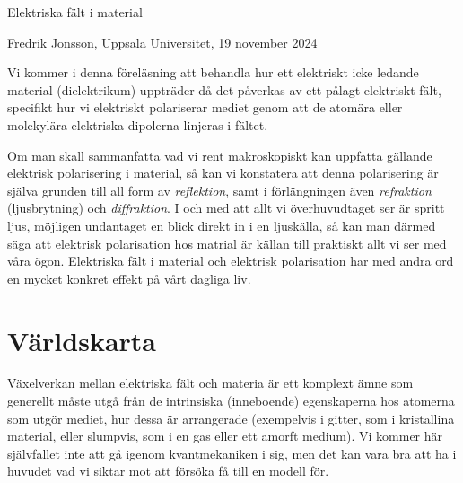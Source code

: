 \centerline{\twelvesc Elektriska f\"alt i material}
\centerline{Fredrik Jonsson, Uppsala Universitet, 19 november 2024}
\vskip24pt
\noindent
Vi kommer i denna f{\"o}rel{\"a}sning att behandla hur ett elektriskt icke
ledande material (dielektrikum) upptr{\"a}der d{\aa} det p{\aa}verkas av ett
p{\aa}lagt elektriskt f{\"a}lt, specifikt hur vi elektriskt polariserar mediet
genom att de atom{\"a}ra eller molekyl{\"a}ra elektriska dipolerna linjeras i
f{\"a}ltet.

Om man skall sammanfatta vad vi rent makroskopiskt kan uppfatta g{\"a}llande
elektrisk polarisering i material, s{\aa} kan vi konstatera att denna
polarisering {\"a}r sj{\"a}lva grunden till all form av {\it reflektion},
samt i f{\"o}rl{\"a}ngningen {\"a}ven {\it refraktion} (ljusbrytning) och
{\it diffraktion}.
I och med att allt vi {\"o}verhuvudtaget ser {\"a}r spritt ljus, m{\"o}jligen
undantaget en blick direkt in i en ljusk{\"a}lla, s{\aa} kan man d{\"a}rmed
s{\"a}ga att elektrisk polarisation hos matrial {\"a}r k{\"a}llan till praktiskt
allt vi ser med v{\aa}ra {\"o}gon. Elektriska f{\"a}lt i material och elektrisk
polarisation har med andra ord en mycket konkret effekt p{\aa} v{\aa}rt dagliga
liv.

\section{V{\"a}rldskarta}
V{\"a}xelverkan mellan elektriska f{\"a}lt och materia {\"a}r ett komplext
{\"a}mne som generellt m{\aa}ste utg{\aa} fr{\aa}n de intrinsiska (inneboende)
egenskaperna hos atomerna som utg{\"o}r mediet, hur dessa {\"a}r arrangerade
(exempelvis i gitter, som i kristallina material, eller slumpvis, som i en gas
eller ett amorft medium).
Vi kommer h{\"a}r sj{\"a}lvfallet inte att g{\aa} igenom kvantmekaniken i sig,
men det kan vara bra att ha i huvudet vad vi siktar mot att f{\"o}rs{\"o}ka
f{\aa} till en modell f{\"o}r.


